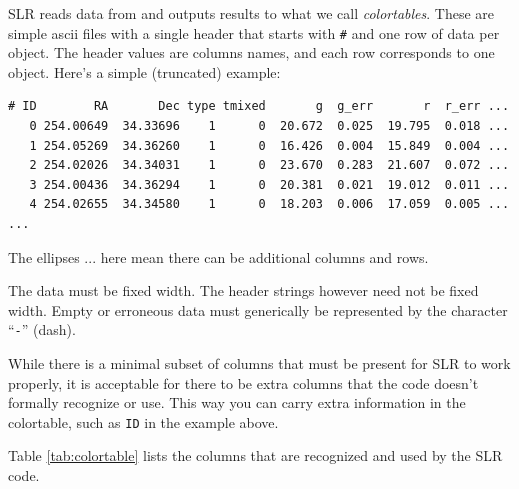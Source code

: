 \documentclass{report}
\begin{document}
SLR reads data from and outputs results to what we call {\it
  colortables}.  These are simple ascii files with a single header
that starts with \verb|#| and one row of data per object.  The header
values are columns names, and each row corresponds to one object.  Here's a simple (truncated) example:
\begin{verbatim}
# ID        RA       Dec type tmixed       g  g_err       r  r_err ...
   0 254.00649  34.33696    1      0  20.672  0.025  19.795  0.018 ...
   1 254.05269  34.36260    1      0  16.426  0.004  15.849  0.004 ...
   2 254.02026  34.34031    1      0  23.670  0.283  21.607  0.072 ...
   3 254.00436  34.36294    1      0  20.381  0.021  19.012  0.011 ...
   4 254.02655  34.34580    1      0  18.203  0.006  17.059  0.005 ...
...
\end{verbatim}
The ellipses ... here mean there can be additional columns and rows.

The data must be fixed width.  The header strings however need not be
fixed width.  Empty or erroneous data must generically be represented
by the character ``\verb|-|'' (dash).

While there is a minimal subset of columns that must be present for
SLR to work properly, it is acceptable for there to be extra columns
that the code doesn't formally recognize or use.  This way you can
carry extra information in the colortable, such as \verb|ID| in the
example above.

Table \ref{tab:colortable} lists the columns that are recognized and
used by the SLR code.
\end{document}
